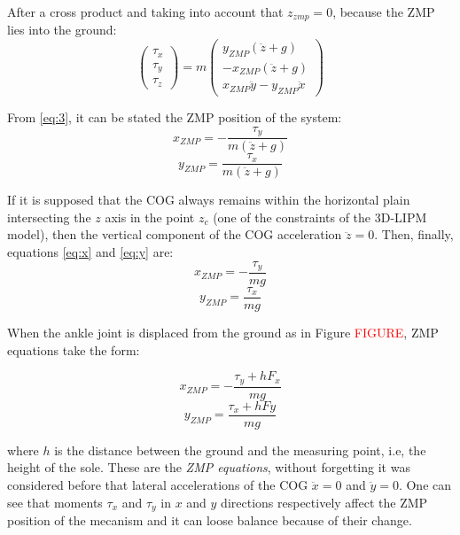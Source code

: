 After a cross product and taking into account that $z_{zmp} = 0$, because the ZMP lies into the ground:
\begin{equation}
\begin{pmatrix}
\tau_x \\
\tau_y \\
\tau_z 
\end{pmatrix} 
= m
\begin{pmatrix}
y_{ZMP}(\ddot{z}+g) \\
-x_{ZMP}(\ddot{z}+g) \\
x_{ZMP}\ddot{y}-y_{ZMP}\ddot{x}
\end{pmatrix}
\label{eq:3}
\end{equation}

From \eqref{eq:3}, it can be stated the ZMP position of the system:
\begin{equation}
x_{ZMP} = -\frac{\tau_y}{m(\ddot{z}+g)}
\label{eq:x}
\end{equation}
\begin{equation}
y_{ZMP} = \frac{\tau_x}{m(\ddot{z}+g)}
\label{eq:y}
\end{equation}

If it is supposed that the COG always remains within the horizontal plain intersecting the $z$ axis in the point $z_c$ (one of the constraints of the 3D-LIPM model), then the vertical component of the COG acceleration $\ddot{z}=0$. Then, finally, equations \eqref{eq:x} and \eqref{eq:y} are:
\begin{equation}
x_{ZMP} = -\frac{\tau_y}{mg}
\label{eq:xzmp}
\end{equation}
\begin{equation}
y_{ZMP} = \frac{\tau_x}{mg}
\label{eq:yzmp}
\end{equation}

When the ankle joint is displaced from the ground as in Figure \textcolor{red}{FIGURE}, ZMP equations take the form:

\begin{equation}
x_{ZMP} = -\frac{\tau_y+hF_x}{mg}
\label{eq:xzmp}
\end{equation}
\begin{equation}
y_{ZMP} = \frac{\tau_x+hFy}{mg}
\label{eq:yzmp}
\end{equation}

where $h$ is the distance between the ground and the measuring point, i.e, the height of the sole. 
These are the \textit{ZMP equations}, without forgetting it was considered before that lateral accelerations of the COG $\ddot{x}=0$ and $\ddot{y}=0$. One can see that moments $\tau_x$ and $\tau_y$ in $x$ and $y$ directions respectively affect the ZMP position of the mecanism and it can loose balance because of their change.

